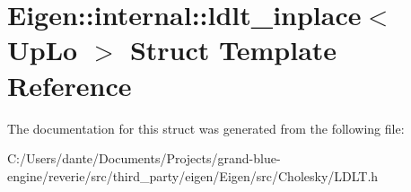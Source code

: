 \hypertarget{struct_eigen_1_1internal_1_1ldlt__inplace}{}\section{Eigen\+::internal\+::ldlt\+\_\+inplace$<$ Up\+Lo $>$ Struct Template Reference}
\label{struct_eigen_1_1internal_1_1ldlt__inplace}


The documentation for this struct was generated from the following file\+:\begin{DoxyCompactItemize}
\item 
C\+:/\+Users/dante/\+Documents/\+Projects/grand-\/blue-\/engine/reverie/src/third\+\_\+party/eigen/\+Eigen/src/\+Cholesky/L\+D\+L\+T.\+h\end{DoxyCompactItemize}
